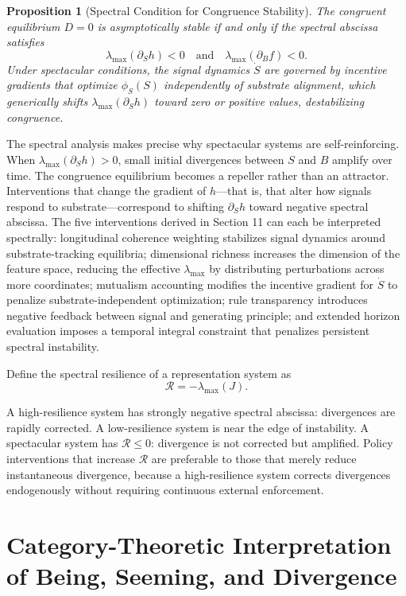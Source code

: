 \documentclass[11pt]{article}
\newtheorem{proposition}{Proposition}
\begin{document}
\begin{proposition}[Spectral Condition for Congruence Stability]
The congruent equilibrium $D = 0$ is asymptotically stable if and only if the spectral abscissa satisfies
\[
\lambda_{\max}(\partial_S h) < 0 \quad \text{and} \quad \lambda_{\max}(\partial_B f) < 0.
\]
Under spectacular conditions, the signal dynamics $\dot{S}$ are governed by incentive gradients that optimize $\phi_S(S)$ independently of substrate alignment, which generically shifts $\lambda_{\max}(\partial_S h)$ toward zero or positive values, destabilizing congruence.
\end{proposition}

The spectral analysis makes precise why spectacular systems are self-reinforcing. When $\lambda_{\max}(\partial_S h) > 0$, small initial divergences between $S$ and $B$ amplify over time. The congruence equilibrium becomes a repeller rather than an attractor. Interventions that change the gradient of $h$---that is, that alter how signals respond to substrate---correspond to shifting $\partial_S h$ toward negative spectral abscissa. The five interventions derived in Section 11 can each be interpreted spectrally: longitudinal coherence weighting stabilizes signal dynamics around substrate-tracking equilibria; dimensional richness increases the dimension of the feature space, reducing the effective $\lambda_{\max}$ by distributing perturbations across more coordinates; mutualism accounting modifies the incentive gradient for $\dot{S}$ to penalize substrate-independent optimization; rule transparency introduces negative feedback between signal and generating principle; and extended horizon evaluation imposes a temporal integral constraint that penalizes persistent spectral instability.

Define the spectral resilience of a representation system as
\[
\mathcal{R} = -\lambda_{\max}(J).
\]

A high-resilience system has strongly negative spectral abscissa: divergences are rapidly corrected. A low-resilience system is near the edge of instability. A spectacular system has $\mathcal{R} \le 0$: divergence is not corrected but amplified. Policy interventions that increase $\mathcal{R}$ are preferable to those that merely reduce instantaneous divergence, because a high-resilience system corrects divergences endogenously without requiring continuous external enforcement.

\section{Category-Theoretic Interpretation of Being, Seeming, and Divergence}
\end{document}
